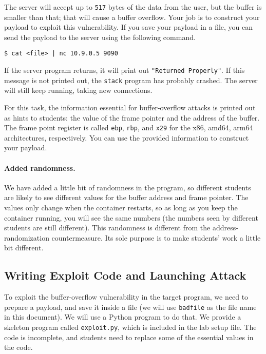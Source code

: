 The server will accept up to \texttt{517} bytes of the data from the 
user, but the buffer is smaller than that; that will cause a buffer overflow. Your job 
is to construct your payload to exploit this vulnerability. If 
you save your payload in a file, you can send the payload
to the server using the following command.

\begin{lstlisting}
$ cat <file> | nc 10.9.0.5 9090
\end{lstlisting}

If the server program returns, it will print out \texttt{"Returned Properly"}.
If this message is not printed out, the \texttt{stack} program has probably crashed. 
The server will still keep running, taking new connections.  

For this task, the information essential for buffer-overflow 
attacks is printed out as hints to students: 
the value of the frame pointer and the address
of the buffer. 
The frame point register is called \texttt{ebp}, \texttt{rbp},
and \texttt{x29} for the x86, amd64, arm64 architectures, respectively. 
You can use the provided information to construct your payload. 


\paragraph{Added randomness.} We have added a little bit of randomness
in the program, so different students are likely to see different values
for the buffer address and frame pointer. The values only change 
when the container restarts, so as long as you keep the 
container running, you will see the same numbers (the numbers 
seen by different students are still different). This randomness
is different from the address-randomization countermeasure. Its sole
purpose is to make students' work a little bit different. 


\subsection{Writing Exploit Code and Launching Attack} 

To exploit the buffer-overflow vulnerability in the target program,
we need to prepare a payload, and save it inside a file (we will use 
\texttt{badfile} as the file name in this document). 
We will use a Python program to do that.
We provide a skeleton program called \texttt{exploit.py}, which
is included in the lab setup file. 
The code is incomplete, and students need to replace some of the essential 
values in the code. 


